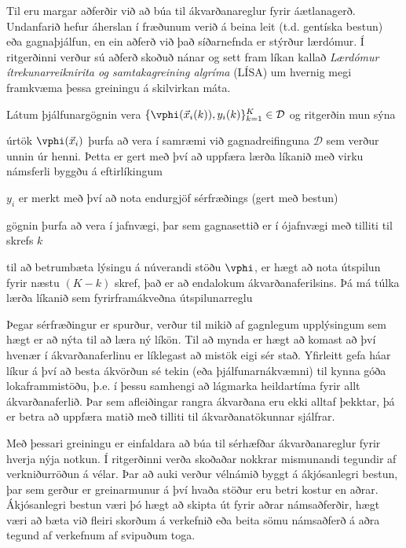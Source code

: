 Til eru margar aðferðir við að búa til ákvarðanareglur fyrir áætlanagerð. 
Undanfarið hefur áherslan í fræðunum verið á beina leit (t.d. gentíska bestun) 
eða gagnaþjálfun, en ein aðferð við það síðarnefnda er stýrður lærdómur.
Í ritgerðinni verður sú aðferð skoðuð nánar og sett fram líkan kallað 
\emph{Lærdómur ítrekunarreiknirita og samtakagreining algríma} (LÍSA) um 
hvernig megi framkvæma þessa greiningu á skilvirkan máta. 

Látum þjálfunargögnin vera 
\mbox{$\{\vphi(\vec{x}_i(k)),y_i(k)\}_{k=1}^K\in\mathcal{D}$} og ritgerðin mun 
sýna
\begin{enumerate*}[itemjoin*={{; einnig }}]
    \item úrtök $\vphi(\vec{x}_i)$ þurfa að vera í samræmi við gagnadreifinguna
    $\mathcal{D}$ sem verður unnin úr henni. Þetta er gert með því að uppfæra 
    lærða líkanið með virku námsferli byggðu á eftirlíkingum
    \item $y_i$ er merkt með því að nota endurgjöf sérfræðings (gert með bestun)
    \item gögnin þurfa að vera í jafnvægi, þar sem gagnasettið er í ójafnvægi 
    með tilliti til skrefs $k$
    \item til að betrumbæta lýsingu á núverandi stöðu $\vphi$, er hægt að 
    nota útspilun fyrir næstu 
    $(K-k)$ skref, það er að endalokum ákvarðanaferilsins. Þá má túlka 
    lærða líkanið sem fyrirframákveðna útspilunarreglu
\end{enumerate*}

Þegar sérfræðingur er spurður, verður til mikið af gagnlegum upplýsingum sem 
hægt er að nýta til að læra ný líkön. Til að mynda er hægt að komast að því 
hvenær í ákvarðana\-ferlinu er líklegast að mistök eigi sér stað. Yfirleitt 
gefa háar líkur á því að besta ákvörðun sé tekin (eða þjálfunarnákvæmni) til 
kynna góða lokaframmistöðu, þ.e. í þessu samhengi að lágmarka heildartíma fyrir 
allt ákvarðanaferlið. 
Þar sem afleiðingar rangra ákvarðana eru ekki alltaf þekktar, 
þá er betra að uppfæra matið með tilliti til ákvarðanatökunnar sjálfrar.

Með þessari greiningu er einfaldara að búa til sérhæfðar ákvarðanareglur fyrir 
hverja nýja notkun. Í ritgerðinni verða skoðaðar nokkrar mismunandi tegundir af 
verkniðurröðun á vélar. 
Þar að auki verður vélnámið byggt á ákjósanlegri bestun, þar sem gerður er 
greinar\-munur á því hvaða stöður eru betri kostur en aðrar. Ákjósanlegri 
bestun væri þó hægt að skipta út fyrir aðrar námsaðferðir, hægt væri að bæta 
við fleiri skorðum á verkefnið eða beita sömu námsaðferð á aðra tegund af 
verkefnum af svipuðum toga. 

